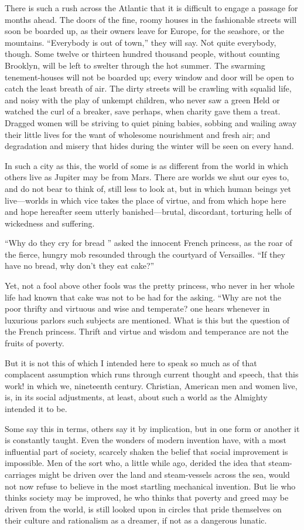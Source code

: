 \documentclass{book}
\begin{document}
There is such a rush across the Atlantic that it is difficult to engage a passage for months ahead. The doors of the fine, roomy houses in the fashionable streets will soon be boarded up, as their owners leave for Europe, for the seashore, or the mountains. “Everybody is out of town,” they will say. Not quite everybody, though. Some twelve or thirteen hundred thousand people, without counting Brooklyn, will be left to swelter through the hot summer. The swarming tenement-houses will not be boarded up; every window and door will be open to catch the least breath of air. The dirty streets will be crawling with squalid life, and noisy with the play of unkempt children, who never saw a green Held or watched the curl of a breaker, save perhaps, when charity gave them a treat. Dragged women will be striving to quiet pining babies, sobbing and wailing away their little lives for the want of wholesome nourishment and fresh air; and degradation and misery that hides during the winter will be seen on every hand.

In such a city as this, the world of some is as different from the world in which others live as Jupiter may be from Mars. There are worlds we shut our eyes to, and do not bear to think of, still less to look at, but in which human beings yet live—worlds in which vice takes the place of virtue, and from which hope here and hope hereafter seem utterly banished—brutal, discordant, torturing hells of wickedness and suffering.

“Why do they cry for bread ” asked the innocent French princess, as the roar of the fierce, hungry mob resounded through the courtyard of Versailles. “If they have no bread, why don’t they eat cake?”

Yet, not a fool above other fools was the pretty princess, who never in her whole life had known that cake was not to be had for the asking. “Why are not the poor thrifty and virtuous and wise and temperate? one hears whenever in luxurious parlors such subjects are mentioned. What is this but the question of the French princess. Thrift and virtue and wisdom and temperance are not the fruits of poverty.

But it is not this of which I intended here to speak so much as of that complacent assumption which runs through current thought and speech, that this work! in which we, nineteenth century. Christian, American men and women live, is, in its social adjustments, at least, about such a world as the Almighty intended it to be.

Some say this in terms, others say it by implication, but in one form or another it is constantly taught. Even the wonders of modern invention have, with a most influential part of society, scarcely shaken the belief that social improvement is impossible. Men of the sort who, a little while ago, derided the idea that steam-carriages might be driven over the land and steam-vessels across the sea, would not now refuse to believe in the most startling mechanical invention. But lie who thinks society may be improved, he who thinks that poverty and greed may be driven from the world, is still looked upon in circles that pride themselves on their culture and rationalism as a dreamer, if not as a dangerous lunatic.
\end{document}
